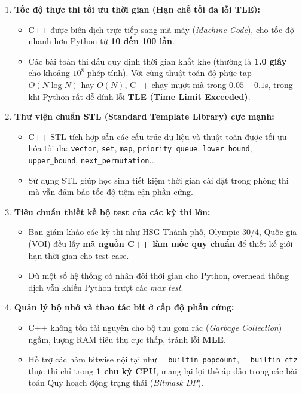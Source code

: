 \documentclass[11pt,a4paper]{article}
\begin{document}
\begin{enumerate}
    \setlength{\itemsep}{3pt}
    \item \textbf{Tốc độ thực thi tối ưu thời gian (Hạn chế tối đa lỗi TLE):}
    \begin{itemize}
        \item C++ được biên dịch trực tiếp sang mã máy (\textit{Machine Code}), cho tốc độ nhanh hơn Python từ \textbf{10 đến 100 lần}.
        \item Các bài toán thi đấu quy định thời gian khắt khe (thường là \textbf{1.0 giây} cho khoảng $10^8$ phép tính). Với cùng thuật toán độ phức tạp $O(N \log N)$ hay $O(N)$, C++ chạy mượt mà trong $0.05 - 0.1$s, trong khi Python rất dễ dính lỗi \textbf{TLE (Time Limit Exceeded)}.
    \end{itemize}

    \item \textbf{Thư viện chuẩn STL (Standard Template Library) cực mạnh:}
    \begin{itemize}
        \item C++ STL tích hợp sẵn các cấu trúc dữ liệu và thuật toán được tối ưu hóa tối đa: \texttt{vector}, \texttt{set}, \texttt{map}, \texttt{priority\_queue}, \texttt{lower\_bound}, \texttt{upper\_bound}, \texttt{next\_permutation}...
        \item Sử dụng STL giúp học sinh tiết kiệm thời gian cài đặt trong phòng thi mà vẫn đảm bảo tốc độ tiệm cận phần cứng.
    \end{itemize}

    \item \textbf{Tiêu chuẩn thiết kế bộ test của các kỳ thi lớn:}
    \begin{itemize}
        \item Ban giám khảo các kỳ thi như HSG Thành phố, Olympic 30/4, Quốc gia (VOI) đều lấy \textbf{mã nguồn C++ làm mốc quy chuẩn} để thiết kế giới hạn thời gian cho test case.
        \item Dù một số hệ thống có nhân đôi thời gian cho Python, overhead thông dịch vẫn khiến Python trượt các \textit{max test}.
    \end{itemize}

    \item \textbf{Quản lý bộ nhớ và thao tác bit ở cấp độ phần cứng:}
    \begin{itemize}
        \item C++ không tốn tài nguyên cho bộ thu gom rác (\textit{Garbage Collection}) ngầm, lượng RAM tiêu thụ cực thấp, tránh lỗi \textbf{MLE}.
        \item Hỗ trợ các hàm bitwise nội tại như \texttt{\_\_builtin\_popcount}, \texttt{\_\_builtin\_ctz} thực thi chỉ trong \textbf{1 chu kỳ CPU}, mang lại lợi thế áp đảo trong các bài toán Quy hoạch động trạng thái (\textit{Bitmask DP}).
    \end{itemize}


\end{enumerate}
\end{document}
